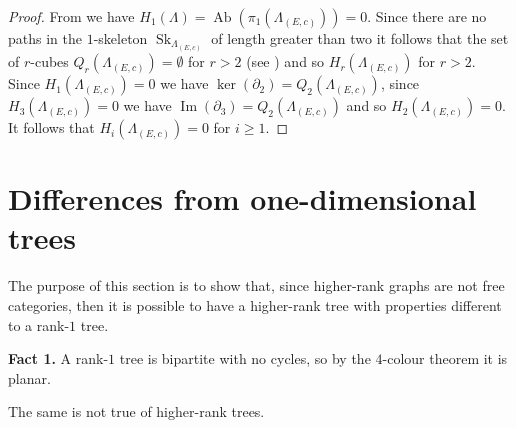 \documentclass[12pt]{amsart}
\theoremstyle{definition}
\theoremstyle{remark}
\numberwithin{equation}{section}
\newcommand{\Sk}{\operatorname{Sk}}
\begin{document}
\begin{proof}
From \cite[Proposition 6.2]{KPW} we have $H_1 ( \Lambda ) = \operatorname{Ab} ( \pi_1 ( \Lambda_{(E,c)} ) ) = 0$. Since there are no paths in the $1$-skeleton $\Sk_{\Lambda_{(E,c)}}$ of length greater than two it follows that the set of $r$-cubes $Q_r ( \Lambda_{(E,c)} ) = \emptyset$ for $r > 2$ (see \cite[Definition 2.10]{KPS3}) and so $H_r ( \Lambda_{(E,c)} )$ for $r > 2$. Since $H_1( \Lambda_{(E,c)}) =0$ we have $\operatorname{ker} (\partial_2)=Q_2( \Lambda_{(E,c)} )$, since $H_3 ( \Lambda_{(E,c)} ) = 0$ we have $\operatorname{Im} ( \partial_3) = Q_2 ( \Lambda_{(E,c)} )$ and so $H_2 ( \Lambda_{(E,c)} ) = 0$. It follows that $H_i ( \Lambda_{(E,c)} ) = 0$ for $i \ge 1$.
\end{proof}





\section{Differences from one-dimensional trees}

\noindent
The purpose of this section is to show that, since higher-rank graphs are not free categories, then it is possible to have a  higher-rank tree with properties different to a rank-$1$ tree.


\vspace{3mm}

\textbf{Fact 1.} A rank-$1$ tree is bipartite with no cycles, so by the $4$-colour theorem it is planar.
\vspace{3mm}

\noindent
The same is not true of higher-rank trees.
\end{document}
